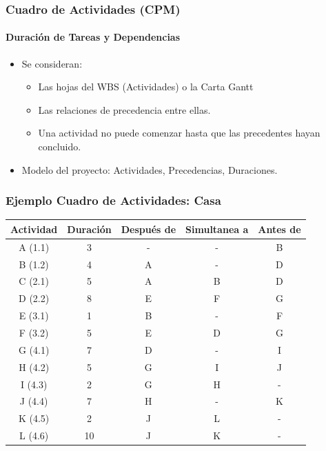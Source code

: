 \documentclass[aspectratio=169]{beamer}%
\begin{document}
\begin{frame}[fragile]
\frametitle{\textbf{Cuadro de Actividades (CPM)}}
\framesubtitle{Duración de Tareas y Dependencias}
\justifying
 \begin{itemize}\justifying
  \item Se consideran:
  \begin{itemize}\justifying
  \item Las hojas del WBS (Actividades) o la Carta Gantt
  \item Las relaciones de precedencia entre ellas.
  \item Una actividad no puede comenzar hasta que las precedentes hayan concluido.
\end{itemize}

  \item Modelo del proyecto: Actividades, Precedencias, Duraciones.
\end{itemize}


\end{frame}

\begin{frame}[fragile]
\frametitle{\textbf{Ejemplo Cuadro de Actividades: Casa}}
\justifying
\begin{center}
\begin{tabular}{|c|c|c|c|c|}\hline
  \textbf{Actividad}&\textbf{Duración} &\textbf{Después de} & \textbf{Simultanea a} & \textbf{Antes de}\\\hline
A (1.1) & 3& -&-&B\\\hline
B (1.2) & 4& A&-&D\\\hline
C (2.1) & 5& A&B&D\\\hline
D (2.2) & 8& E&F&G\\\hline
E (3.1) & 1& B&-&F\\\hline
F (3.2) & 5& E&D&G\\\hline
G (4.1) & 7& D&-&I\\\hline
H (4.2) & 5& G&I&J\\\hline
I  (4.3)& 2& G&H&-\\\hline
J  (4.4)& 7& H&-&K\\\hline
K (4.5) & 2& J&L&-\\\hline
L (4.6) & 10&J&K&-\\\hline
\end{tabular}
\end{center}
\end{frame}
\end{document}

